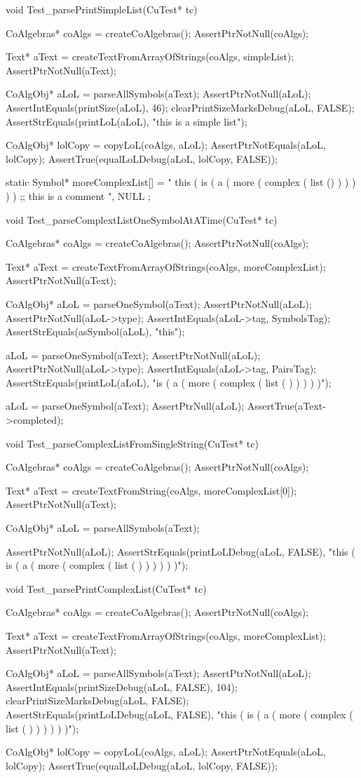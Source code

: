 void Test_parsePrintSimpleList(CuTest* tc) {
  CoAlgebras* coAlgs = createCoAlgebras();
  AssertPtrNotNull(coAlgs);

  Text* aText = createTextFromArrayOfStrings(coAlgs, simpleList);
  AssertPtrNotNull(aText);

  CoAlgObj* aLoL = parseAllSymbols(aText);
  AssertPtrNotNull(aLoL);
  AssertIntEquals(printSize(aLoL), 46);
  clearPrintSizeMarksDebug(aLoL, FALSE);
  AssertStrEquals(printLoL(aLoL), "this is a simple list");

  CoAlgObj* lolCopy = copyLoL(coAlgs, aLoL);
  AssertPtrNotEquals(aLoL, lolCopy);
  AssertTrue(equalLoLDebug(aLoL, lolCopy, FALSE));
}

static Symbol* moreComplexList[] = {
 " this ( is ( a ( more ( complex ( list () ) ) ) ) ) ;; this is a comment ",
 NULL
};

void Test_parseComplextListOneSymbolAtATime(CuTest* tc) {
  CoAlgebras* coAlgs = createCoAlgebras();
  AssertPtrNotNull(coAlgs);

  Text* aText = createTextFromArrayOfStrings(coAlgs, moreComplexList);
  AssertPtrNotNull(aText);

  CoAlgObj* aLoL = parseOneSymbol(aText);
  AssertPtrNotNull(aLoL);
  AssertPtrNotNull(aLoL->type);
  AssertIntEquals(aLoL->tag, SymbolsTag);
  AssertStrEquals(asSymbol(aLoL), "this");

  aLoL = parseOneSymbol(aText);
  AssertPtrNotNull(aLoL);
  AssertPtrNotNull(aLoL->type);
  AssertIntEquals(aLoL->tag, PairsTag);
  AssertStrEquals(printLoL(aLoL),
                    "is ( a ( more ( complex ( list ( ) ) ) ) )");

  aLoL = parseOneSymbol(aText);
  AssertPtrNull(aLoL);
  AssertTrue(aText->completed);
}

void Test_parseComplexListFromSingleString(CuTest* tc) {
  CoAlgebras* coAlgs = createCoAlgebras();
  AssertPtrNotNull(coAlgs);

  Text* aText = createTextFromString(coAlgs, moreComplexList[0]);
  AssertPtrNotNull(aText);

  CoAlgObj* aLoL = parseAllSymbols(aText);

  AssertPtrNotNull(aLoL);
  AssertStrEquals(printLoLDebug(aLoL, FALSE),
    "this ( is ( a ( more ( complex ( list ( ) ) ) ) ) )");
}

void Test_parsePrintComplexList(CuTest* tc) {
  CoAlgebras* coAlgs = createCoAlgebras();
  AssertPtrNotNull(coAlgs);

  Text* aText = createTextFromArrayOfStrings(coAlgs, moreComplexList);
  AssertPtrNotNull(aText);

  CoAlgObj* aLoL = parseAllSymbols(aText);
  AssertPtrNotNull(aLoL);
  AssertIntEquals(printSizeDebug(aLoL, FALSE), 104);
  clearPrintSizeMarksDebug(aLoL, FALSE);
  AssertStrEquals(printLoLDebug(aLoL, FALSE),
    "this ( is ( a ( more ( complex ( list ( ) ) ) ) ) )");

  CoAlgObj* lolCopy = copyLoL(coAlgs, aLoL);
  AssertPtrNotEquals(aLoL, lolCopy);
  AssertTrue(equalLoLDebug(aLoL, lolCopy, FALSE));
}


